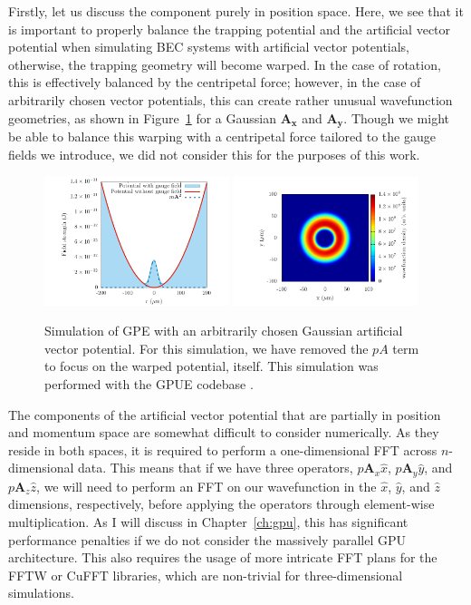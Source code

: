 Firstly, let us discuss the component purely in position space.
Here, we see that it is important to properly balance the trapping potential and the artificial vector potential when simulating BEC systems with artificial vector potentials, otherwise, the trapping geometry will become warped.
In the case of rotation, this is effectively balanced by the centripetal force; however, 
in the case of arbitrarily chosen vector potentials, this can create rather unusual wavefunction geometries, as shown in Figure~\ref{fig:V_change} for a Gaussian $\mathbf{A_x}$ and $\mathbf{A_y}$.
Though we might be able to balance this warping with a centripetal force tailored to the gauge fields we introduce, we did not consider this for the purposes of this work.

\begin{figure}

\begin{centering}
\includegraphics[width=0.48\textwidth]{data/splitop/gauge/check.pdf}
\includegraphics[width=0.48\textwidth]{data/splitop/gauge/density.pdf}
\end{centering}

\caption{
Simulation of GPE with an arbitrarily chosen Gaussian artificial vector potential.
For this simulation, we have removed the $pA$ term to focus on the warped potential, itself.
This simulation was performed with the GPUE codebase \cite{schloss2018}.
}
\label{fig:V_change}
\end{figure}

The components of the artificial vector potential that are partially in position and momentum space are somewhat difficult to consider numerically.
As they reside in both spaces, it is required to perform a one-dimensional FFT across $n$-dimensional data.
This means that if we have three operators, $p\mathbf{A}_x \hat x$, $p\mathbf{A}_y \hat y$, and $p\mathbf{A}_z \hat z$, we will need to perform an FFT on our wavefunction in the $\hat x$, $\hat y$, and $\hat z$ dimensions, respectively, before applying the operators through element-wise multiplication. 
As I will discuss in Chapter~\ref{ch:gpu}, this has significant performance penalties if we do not consider the massively parallel GPU architecture.
This also requires the usage of more intricate FFT plans for the FFTW or CuFFT libraries, which are non-trivial for three-dimensional simulations.

